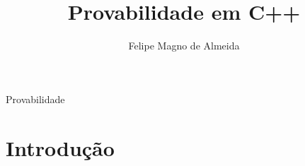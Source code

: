 \documentclass[12pt]{article}
\title{Provabilidade em C++}
\author{Felipe Magno de Almeida}
\begin{document}
 

\maketitle
     
\begin{resumo} 

  Provabilidade

\end{resumo}

\section{Introdução}
\end{document}
